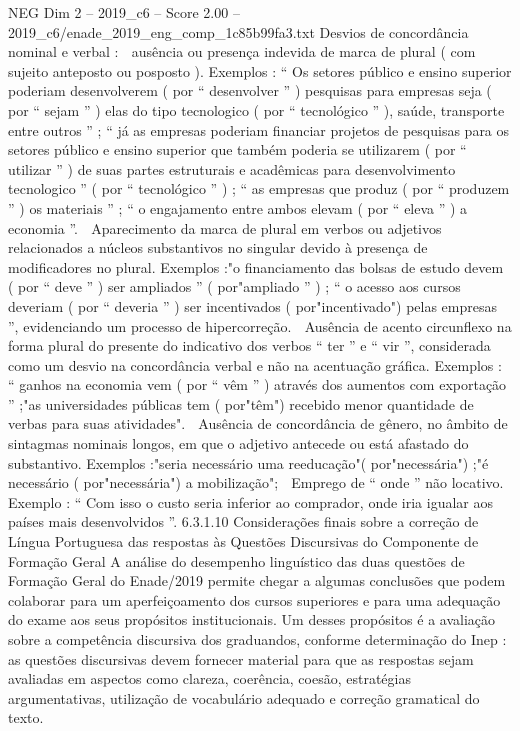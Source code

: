 \begin{textsample}{NEG Dim 2 – 2019\_c6 – Score 2.00 – 2019\_c6/enade\_2019\_eng\_comp\_1c85b99fa3.txt}
Desvios de concordância nominal e verbal :  ausência ou presença indevida de marca de plural ( com sujeito anteposto ou posposto ).
Exemplos : “ Os setores público e ensino superior poderiam desenvolverem ( por “ desenvolver ” ) pesquisas para empresas seja ( por “ sejam ” ) elas do tipo tecnologico ( por “ tecnológico ” ), saúde, transporte entre outros ” ; “ já as empresas poderiam financiar projetos de pesquisas para os setores público e ensino superior que também poderia se utilizarem ( por “ utilizar ” ) de suas partes estruturais e acadêmicas para desenvolvimento tecnologico ” ( por “ tecnológico ” ) ; “ as empresas que produz ( por “ produzem ” ) os materiais ” ; “ o engajamento entre ambos elevam ( por “ eleva ” ) a economia ”.  Aparecimento da marca de plural em verbos ou adjetivos relacionados a núcleos substantivos no singular devido à presença de modificadores no plural.
Exemplos :"o financiamento das bolsas de estudo devem ( por “ deve ” ) ser ampliados ” ( por"ampliado ” ) ; “ o acesso aos cursos deveriam ( por “ deveria ” ) ser incentivados ( por"incentivado") pelas empresas ”, evidenciando um processo de hipercorreção.  Ausência de acento circunflexo na forma plural do presente do indicativo dos verbos “ ter ” e “ vir ”, considerada como um desvio na concordância verbal e não na acentuação gráfica.
Exemplos : “ ganhos na economia vem ( por “ vêm ” ) através dos aumentos com exportação ” ;"as universidades públicas tem ( por"têm") recebido menor quantidade de verbas para suas atividades".  Ausência de concordância de gênero, no âmbito de sintagmas nominais longos, em que o adjetivo antecede ou está afastado do substantivo.
Exemplos :"seria necessário uma reeducação"( por"necessária") ;"é necessário ( por"necessária") a mobilização";  Emprego de “ onde ” não locativo.
Exemplo : “ Com isso o custo seria inferior ao comprador, onde iria igualar aos países mais desenvolvidos ”. 6.3.1.10 Considerações finais sobre a correção de Língua Portuguesa das respostas às Questões Discursivas do Componente de Formação Geral A análise do desempenho linguístico das duas questões de Formação Geral do Enade/2019 permite chegar a algumas conclusões que podem colaborar para um aperfeiçoamento dos cursos superiores e para uma adequação do exame aos seus propósitos institucionais.
Um desses propósitos é a avaliação sobre a competência discursiva dos graduandos, conforme determinação do Inep : as questões discursivas devem fornecer material para que as respostas sejam avaliadas em aspectos como clareza, coerência, coesão, estratégias argumentativas, utilização de vocabulário adequado e correção gramatical do texto.

\end{textsample}
